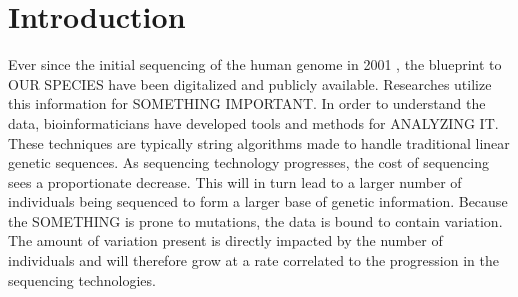 \documentclass[thesis.tex]{subfiles}
\begin{document}
\chapter{Introduction}
Ever since the initial sequencing of the human genome in 2001 \cite{human_genome}, the blueprint to OUR SPECIES have been digitalized and publicly available. Researches utilize this information for SOMETHING IMPORTANT. In order to understand the data, bioinformaticians have developed tools and methods for ANALYZING IT. These techniques are typically string algorithms made to handle traditional linear genetic sequences. As sequencing technology progresses, the cost of sequencing sees a proportionate decrease. This will in turn lead to a larger number of individuals being sequenced to form a larger base of genetic information. Because the SOMETHING is prone to mutations, the data is bound to contain variation. The amount of variation present is directly impacted by the number of individuals and will therefore grow at a rate correlated to the progression in the sequencing technologies. 
\end{document}
